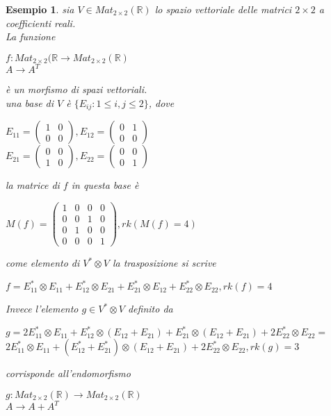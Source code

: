 \documentclass[a4paper,12pt]{article}
\theoremstyle{def}
\theoremstyle{prop}
\theoremstyle{esempio}
\newtheorem*{example}{Esempio}
\theoremstyle{dimostrazione}
\theoremstyle{teo}
\theoremstyle{osservazione}
\begin{document}
\begin{example}
	sia \(V \in Mat_{2 \times 2}(\mathbb{R})\) lo spazio vettoriale delle matrici \(2 \times 2\) a coefficienti reali.\\
	La funzione\begin{center}
		\(f: Mat_{2 \times 2}(\mathbb{R} \rightarrow Mat_{2 \times 2}(\mathbb{R})\)\\
		\(A \rightarrow A^T\)
	\end{center}
	è un morfismo di spazi vettoriali.\\
	una base di \(V\) è \(\{E_{ij} : 1 \leq i,j \leq 2\}\), dove
	\begin{center}
		\(E_{11} = \begin{pmatrix}
			1 & 0 \\
			0 & 0
		\end{pmatrix},
		E_{12} = \begin{pmatrix}
			0 & 1 \\
			0 & 0
		\end{pmatrix}\)\\
		\(E_{21} = \begin{pmatrix}
			0 & 0 \\
			1 & 0
		\end{pmatrix},
		E_{22} = \begin{pmatrix}
			0 & 0 \\
			0 & 1
		\end{pmatrix}\)
	\end{center}
	la matrice di \(f\) in questa base è
	\begin{center}
		\(M(f) = \begin{pmatrix}
			1 & 0 & 0 & 0 \\
			0 & 0 & 1 & 0 \\
			0 & 1 & 0 & 0 \\
			0 & 0 & 0 & 1
		\end{pmatrix}, rk(M(f) = 4)\)
	\end{center}
	come elemento di \(V^* \otimes V\) la trasposizione si scrive
	\begin{center}
		\(f = E_{11}^* \otimes E_{11} + E_{12}^* \otimes E_{21} + E_{21}^* \otimes E_{12} + E_{22}^* \otimes E_{22}, rk(f) = 4\)
	\end{center}
	\newpage
	Invece l'elemento \(g \in V^* \otimes V\) definito da
	\begin{center}
		\(g =  2E_{11}^* \otimes E_{11} + E_{12}^* \otimes (E_{12} + E_{21}) + E_{21}^* \otimes (E_{12} + E_{21}) + 2E_{22}^* \otimes E_{22} = \)\\
		\(2E_{11}^* \otimes E_{11} + (E_{12}^* + E_{21}^*) \otimes (E_{12} + E_{21}) + 2E_{22}^* \otimes E_{22}, rk(g) = 3\)
	\end{center}
	corrisponde all'endomorfismo
	\begin{center}
		\(g: Mat_{2 \times 2}(\mathbb{R}) \rightarrow Mat_{2 \times 2}(\mathbb{R})\)\\
		\(A \rightarrow A + A^T\)
	\end{center}
\end{example}
\end{document}
